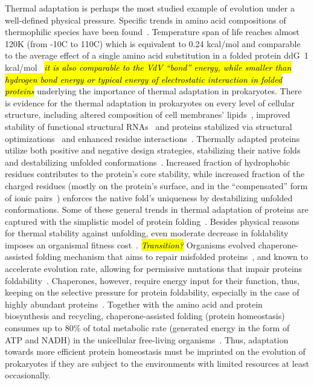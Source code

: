 \documentclass[10pt,letterpaper]{article}
\begin{document}
Thermal adaptation is perhaps the most studied example of evolution under a well-defined physical pressure. Specific trends in amino acid compositions of thermophilic species have been found~\cite{Zeldovich2007Protein,Singer2003Thermophilic,Kreil2001Identification,Haney1999Thermal}. Temperature span of life reaches almost 120K (from -10C to 110C) which is equivalent to 0.24 kcal/mol and comparable to the average effect of a single amino acid substitution in a folded protein ddG~1 kcal/mol~\cite{Zeldovich2007Proteinb} \hl{\it it is also comparable to the VdV ``bond'' energy, while smaller than hydrogen bond energy or typical energy of electrostatic interaction in folded proteins} underlying the importance of thermal adaptation in prokaryotes. There is evidence for the thermal adaptation in prokaryotes on every level of cellular structure, including altered composition of cell membranes' lipids~\cite{Chugunov2014Liquid}, improved stability of functional structural RNAs~\cite{Galtier1997Relationships} and proteins stabilized via structural optimizations~\cite{Szilagyi2000Structural,England2003Natural} and enhanced residue interactions~\cite{Berezovsky2007Positive}. Thermally adapted proteins utilize both positive and negative design strategies, stabilizing their native folds and destabilizing unfolded conformations~\cite{Berezovsky2007Positive}. Increased fraction of hydrophobic residues contributes to the protein's core stability, while increased fraction of the charged residues (mostly on the protein's surface, and in the ``compensated'' form of ionic pairs~\cite{Szilagyi2000Structural}) enforces the native fold's uniqueness by destabilizing unfolded conformations. Some of these general trends in thermal adaptation of proteins are captured with the simplistic model of protein folding~\cite{Berezovsky2007Positive}. Besides physical reasons for thermal stability against unfolding, even moderate decrease in foldability imposes an organismal fitness cost~\cite{Drummond2008MistranslationInduced,Samerotte2011Misfolded}. \hl{\it Transition?} Organisms evolved chaperone-assisted folding mechanism that aims to repair misfolded proteins~\cite{Hartl2011Molecular}, and known to accelerate evolution rate, allowing for permissive mutations that impair proteins foldability~\cite{Cetinbas2013Catalysis}. Chaperones, however, require energy input for their function, thus, keeping on the selective pressure for protein foldability, especially in the case of highly abundant proteins~\cite{Kepp2014Model}. Together with the amino acid and protein biosynthesis and recycling, chaperone-assisted folding (protein homeostasis) consumes up to 80\% of total metabolic rate (generated energy in the form of ATP and NADH) in the unicellular free-living organisms~\cite{Kepp2014Model}. Thus, adaptation towards more efficient protein homeostasis must be imprinted on the evolution of prokaryotes if they are subject to the environments with limited resources at least occasionally.
\end{document}
